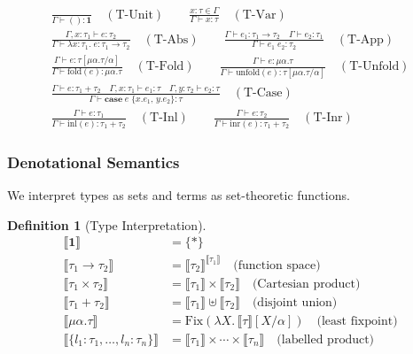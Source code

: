 \documentclass[11pt]{article}
\theoremstyle{definition}
\newtheorem{definition}[theorem]{Definition}
\theoremstyle{remark}
\newcommand{\sem}[1]{\llbracket #1 \rrbracket}
\begin{document}
\begin{gather}
  \frac{}{\Gamma \vdash () : \mathbf{1}} \quad (\text{T-Unit})
  \qquad
  \frac{x:\tau \in \Gamma}{\Gamma \vdash x : \tau} \quad (\text{T-Var})
  \\[8pt]
  \frac{\Gamma, x:\tau_1 \vdash e : \tau_2}
       {\Gamma \vdash \lambda x:\tau_1.\; e : \tau_1 \to \tau_2}
  \quad (\text{T-Abs})
  \qquad
  \frac{\Gamma \vdash e_1 : \tau_1 \to \tau_2 \quad \Gamma \vdash e_2 : \tau_1}
       {\Gamma \vdash e_1\; e_2 : \tau_2}
  \quad (\text{T-App})
  \\[8pt]
  \frac{\Gamma \vdash e : \tau[\mu\alpha.\tau/\alpha]}
       {\Gamma \vdash \mathrm{fold}(e) : \mu\alpha.\tau}
  \quad (\text{T-Fold})
  \qquad
  \frac{\Gamma \vdash e : \mu\alpha.\tau}
       {\Gamma \vdash \mathrm{unfold}(e) : \tau[\mu\alpha.\tau/\alpha]}
  \quad (\text{T-Unfold})
  \\[8pt]
  \frac{\Gamma \vdash e : \tau_1 + \tau_2 \quad
        \Gamma, x:\tau_1 \vdash e_1 : \tau \quad
        \Gamma, y:\tau_2 \vdash e_2 : \tau}
       {\Gamma \vdash \mathbf{case}\; e\; \{x.e_1,\, y.e_2\} : \tau}
  \quad (\text{T-Case})
  \\[8pt]
  \frac{\Gamma \vdash e : \tau_1}
       {\Gamma \vdash \mathrm{inl}(e) : \tau_1 + \tau_2}
  \quad (\text{T-Inl})
  \qquad
  \frac{\Gamma \vdash e : \tau_2}
       {\Gamma \vdash \mathrm{inr}(e) : \tau_1 + \tau_2}
  \quad (\text{T-Inr})
\end{gather}

\subsubsection{Denotational Semantics}

We interpret types as sets and terms as set-theoretic functions.

\begin{definition}[Type Interpretation]
\label{def:type-interp}
\begin{align}
  \sem{\mathbf{1}} &= \{\ast\} \\
  \sem{\tau_1 \to \tau_2} &= \sem{\tau_2}^{\sem{\tau_1}}
    \quad\text{(function space)} \\
  \sem{\tau_1 \times \tau_2} &= \sem{\tau_1} \times \sem{\tau_2}
    \quad\text{(Cartesian product)} \\
  \sem{\tau_1 + \tau_2} &= \sem{\tau_1} \uplus \sem{\tau_2}
    \quad\text{(disjoint union)} \\
  \sem{\mu\alpha.\tau} &= \mathrm{Fix}(\lambda X.\, \sem{\tau}[X/\alpha])
    \quad\text{(least fixpoint)} \\
  \sem{\{l_1:\tau_1, \ldots, l_n:\tau_n\}} &=
    \sem{\tau_1} \times \cdots \times \sem{\tau_n}
    \quad\text{(labelled product)}
\end{align}
\end{definition}
\end{document}
